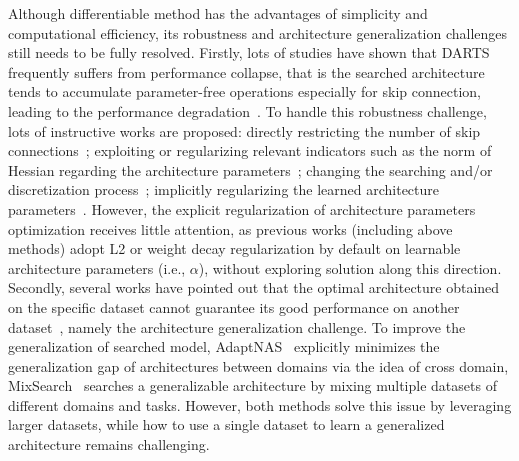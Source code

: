 \documentclass[10pt,twocolumn,letterpaper]{article}
\begin{document}
Although differentiable method has the advantages of simplicity and computational efficiency, its robustness and architecture generalization challenges still needs to be fully resolved. 
Firstly, lots of studies have shown that DARTS frequently suffers from performance collapse, that is the searched architecture tends to accumulate parameter-free operations especially for skip connection, leading to the performance degradation~\cite{darts-,rdarts}. To handle this robustness challenge, lots of instructive works are proposed: directly restricting the number of skip connections~\cite{pdarts,darts+}; exploiting or regularizing relevant indicators such as the norm of Hessian regarding the architecture parameters~\cite{rdarts,sdarts}; changing the searching and/or discretization process~\cite{fairdarts,dots,darts-}; implicitly regularizing the learned architecture parameters~\cite{rdarts}. However, the explicit regularization of architecture parameters optimization receives little attention, as previous works (including above methods) adopt L2 or weight decay regularization by default on learnable architecture parameters (i.e., $\alpha$), without exploring solution along this direction. Secondly, several works have pointed out that the optimal architecture obtained on the specific dataset cannot guarantee its good performance on another dataset~\cite{adaptNAS,mixsearch}, namely the architecture generalization challenge. To improve the generalization of searched model, AdaptNAS~\cite{adaptNAS} explicitly minimizes the generalization gap of architectures between domains via the idea of cross domain,
MixSearch~\cite{mixsearch} searches a generalizable architecture by mixing multiple datasets of different domains and tasks. 
However, both methods solve this issue by leveraging larger datasets, while how to use a single dataset to learn a generalized architecture remains challenging. 
\end{document}
